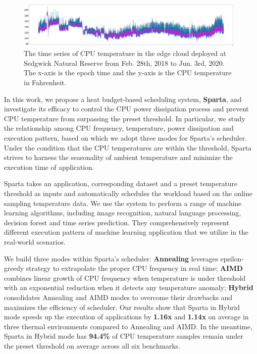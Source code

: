 \begin{figure}
\includegraphics[width=\textwidth]{figures/time_series.png}
\caption{The time series of CPU temperature in the edge cloud deployed at Sedgwick Natural Reserve from Feb. 28th, 2018 to Jun. 3rd, 2020. The x-axis is the epoch time and the y-axis is the CPU temperature in Fahrenheit. } \label{fig:time_series}
\end{figure}

In this work, we propose a heat budget-based scheduling system, \textbf{Sparta}, and investigate its efficacy to control the CPU power dissipation process and prevent CPU temperature from surpassing the preset threshold. In particular, we study the relationship among CPU frequency, temperature, power dissipation and execution pattern, based on which we adopt three modes for Sparta's scheduler. Under the condition that the CPU temperatures are within the threshold, Sparta strives to harness the seasonality of ambient temperature and minimize the execution time of application.

Sparta takes an application, corresponding dataset and a preset temperature threshold as inputs and automatically schedules the workload based on the online sampling temperature data. We use the system to perform a range of machine learning algorithms, including image recognition, natural language processing, decision forest and time series prediction. They comprehensively represent different execution pattern of machine learning application that we utilize in the real-world scenarios.

We build three modes within Sparta's scheduler: \textbf{Annealing} leverages epsilon-greedy strategy to extrapolate the proper CPU frequency in real time; \textbf{AIMD} combines linear growth of CPU frequency when temperature is under threshold with an exponential reduction when it detects any temperature anomaly; \textbf{Hybrid} consolidates Annealing and AIMD modes to overcome their drawbacks and maximizes the efficiency of scheduler. Our results show that Sparta in Hybrid mode speeds up the execution of applications by \textbf{1.16x} and \textbf{1.14x} on average in three thermal environments compared to Annealing and AIMD. In the meantime, Sparta in Hybrid mode has \textbf{94.4\%} of CPU temperature samples remain under the preset threshold on average across all six benchmarks. 

